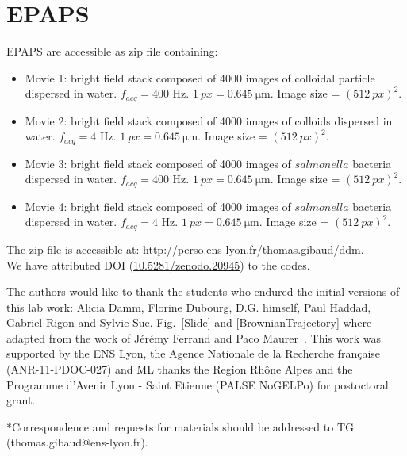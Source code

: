 \documentclass[%
 aip,
 jmp,%
 amsmath,amssymb,
reprint,%
]{revtex4-1}
\begin{document}
\section*{\label{epaps}EPAPS}
EPAPS are accessible as zip file containing:
\begin{itemize}
 \item Movie 1: bright field stack composed of 4000 images of colloidal particle dispersed in water. $f_{acq}=400$ Hz. $\SI{1}{px} = \SI{0.645}{\micro\meter}$. Image size = $(\SI{512}{px})^2$.
 \item Movie 2: bright field stack composed of 4000 images of colloids dispersed in water. $f_{acq}=4$ Hz. $\SI{1}{px} = \SI{0.645}{\micro\meter}$. Image size = $(\SI{512}{px})^2$.
 \item Movie 3: bright field stack composed of 4000 images of $salmonella$ bacteria dispersed in water. $f_{acq}=400$ Hz. $\SI{1}{px} = \SI{0.645}{\micro\meter}$. Image size = $(\SI{512}{px})^2$.
 \item Movie 4: bright field stack composed of 4000 images of $salmonella$ bacteria dispersed in water. $f_{acq}=4$ Hz. $\SI{1}{px} = \SI{0.645}{\micro\meter}$. Image size = $(\SI{512}{px})^2$.
\end{itemize}
The zip file is accessible at: \url{http://perso.ens-lyon.fr/thomas.gibaud/ddm}.\\
We have attributed DOI (\href{http://dx.doi.org/10.5281/zenodo.20945}{10.5281/zenodo.20945})\cite{code_github} to the codes.


\begin{acknowledgments}
The authors would like to thank the students who endured the initial versions of this lab work: Alicia Damm, Florine Dubourg, D.G. himself, Paul Haddad, Gabriel Rigon and Sylvie Sue. Fig.~\ref{Slide} and \ref{BrownianTrajectory} where adapted from the work of J\'er\'emy Ferrand and Paco Maurer~\cite{Maurer2014}. 
This work was supported by the ENS Lyon, the Agence Nationale de la Recherche fran\c{c}aise (ANR-11-PDOC-027) and ML thanks the Region Rh\^one Alpes and
the Programme d'Avenir Lyon - Saint Etienne (PALSE NoGELPo) for postoctoral grant.
\end{acknowledgments}

*Correspondence and requests for materials should be addressed to TG (thomas.gibaud@ens-lyon.fr).



\end{document}
